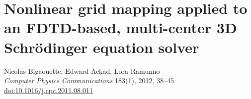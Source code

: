 
\newcommand{\PaperTitleMapping}{Nonlinear grid mapping applied to an FDTD-based, multi-center 3D
                                  Schr\"odinger equation solver}

\section{\PaperTitleMapping}
\label{section:papers:qfdtd}

\begin{flushright}
Nicolas Bigaouette, Edward Ackad, Lora Ramunno\\
\textit{Computer Physics Communications} 183(1), 2012, 38–45\\
\href{http://dx.doi.org/10.1016/j.cpc.2011.08.011}{doi:10.1016/j.cpc.2011.08.011}
\end{flushright}

\HidePDFAbstractNumber


